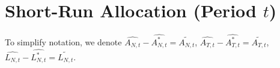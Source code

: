 \documentclass[a4paper,12pt]{article} %
\theoremstyle{nonitalic}
\begin{document}


\section{Short-Run Allocation (Period $t$)}
To simplify notation, we denote $ \widehat{A_{N,t}} - \widehat{A_{N,t}^*}  = \widetilde{A_{N,t}}$, $ \widehat{A_{T,t}} - \widehat{A_{T,t}^*}  = \widetilde{A_{T,t}}$, $ \widehat{L_{N,t}} - \widehat{L_{N,t}^*}  = \widetilde{L_{N,t}}$. 
\end{document}
